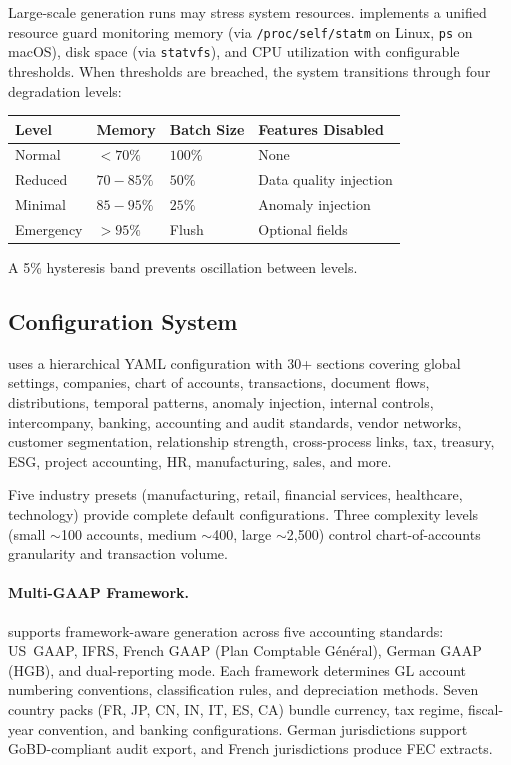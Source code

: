 Large-scale generation runs may stress system resources.  \system{}
implements a unified resource guard monitoring memory (via
\texttt{/proc/self/statm} on Linux, \texttt{ps} on macOS), disk space
(via \texttt{statvfs}), and CPU utilization with configurable thresholds.
When thresholds are breached, the system transitions through four
degradation levels:

\begin{center}
\begin{tabular}{llll}
\toprule
\textbf{Level} & \textbf{Memory} & \textbf{Batch Size}
  & \textbf{Features Disabled} \\
\midrule
Normal     & $<70\%$  & $100\%$ & None \\
Reduced    & $70{-}85\%$ & $50\%$  & Data quality injection \\
Minimal    & $85{-}95\%$ & $25\%$  & Anomaly injection \\
Emergency  & $>95\%$  & Flush   & Optional fields \\
\bottomrule
\end{tabular}
\end{center}

A 5\% hysteresis band prevents oscillation between levels.

\subsection{Configuration System}
\label{sec:arch_config}

\system{} uses a hierarchical YAML configuration with 30+ sections
covering global settings, companies, chart of accounts, transactions,
document flows, distributions, temporal patterns, anomaly injection,
internal controls, intercompany, banking, accounting and audit
standards, vendor networks, customer segmentation, relationship
strength, cross-process links, tax, treasury, ESG, project accounting,
HR, manufacturing, sales, and more.

Five industry presets (manufacturing, retail, financial services,
healthcare, technology) provide complete default configurations.
Three complexity levels (small $\sim$100 accounts, medium $\sim$400,
large $\sim$2{,}500) control chart-of-accounts granularity and
transaction volume.

\paragraph{Multi-GAAP Framework.}
\system{} supports framework-aware generation across five accounting
standards: US~GAAP, IFRS, French GAAP (Plan Comptable
G\'{e}n\'{e}ral), German GAAP (HGB), and dual-reporting mode.  Each
framework determines GL account numbering conventions, classification
rules, and depreciation methods.  Seven country packs (FR, JP, CN, IN,
IT, ES, CA) bundle currency, tax regime, fiscal-year convention, and
banking configurations.  German jurisdictions support GoBD-compliant
audit export, and French jurisdictions produce FEC extracts.


